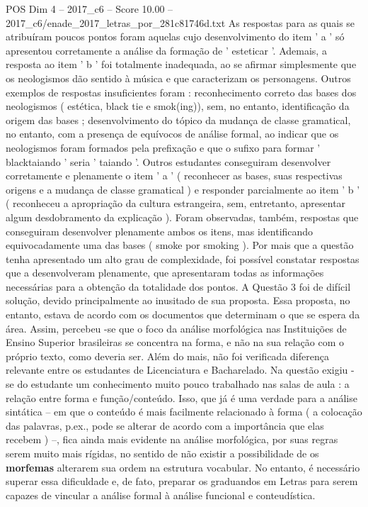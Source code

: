 \begin{textsample}{POS Dim 4 – 2017\_c6 – Score 10.00 – 2017\_c6/enade\_2017\_letras\_por\_281c81746d.txt}
As respostas para as quais se atribuíram poucos pontos foram aquelas cujo desenvolvimento do item ' a ' só apresentou corretamente a análise da formação de ' esteticar '.
Ademais, a resposta ao item ' b ' foi totalmente inadequada, ao se afirmar simplesmente que os neologismos dão sentido à música e que caracterizam os personagens.
Outros exemplos de respostas insuficientes foram : reconhecimento correto das bases dos neologismos ( estética, black tie e smok(ing)), sem, no entanto, identificação da origem das bases ; desenvolvimento do tópico da mudança de classe gramatical, no entanto, com a presença de equívocos de análise formal, ao indicar que os neologismos foram formados pela prefixação e que o sufixo para formar ' blacktaiando ' seria ' taiando '.
Outros estudantes conseguiram desenvolver corretamente e plenamente o item ' a ' ( reconhecer as bases, suas respectivas origens e a mudança de classe gramatical ) e responder parcialmente ao item ' b ' ( reconheceu a apropriação da cultura estrangeira, sem, entretanto, apresentar algum desdobramento da explicação ).
Foram observadas, também, respostas que conseguiram desenvolver plenamente ambos os itens, mas identificando equivocadamente uma das bases ( smoke por smoking ).
Por mais que a questão tenha apresentado um alto grau de complexidade, foi possível constatar respostas que a desenvolveram plenamente, que apresentaram todas as informações necessárias para a obtenção da totalidade dos pontos.
A Questão 3 foi de difícil solução, devido principalmente ao inusitado de sua proposta.
Essa proposta, no entanto, estava de acordo com os documentos que determinam o que se espera da área.
Assim, percebeu -se que o foco da análise morfológica nas Instituições de Ensino Superior brasileiras se concentra na forma, e não na sua relação com o próprio texto, como deveria ser.
Além do mais, não foi verificada diferença relevante entre os estudantes de Licenciatura e Bacharelado.
Na questão exigiu -se do estudante um conhecimento muito pouco trabalhado nas salas de aula : a relação entre forma e função/conteúdo.
Isso, que já é uma verdade para a análise sintática – em que o conteúdo é mais facilmente relacionado à forma ( a colocação das palavras, p.ex., pode se alterar de acordo com a importância que elas recebem ) –, fica ainda mais evidente na análise morfológica, por suas regras serem muito mais rígidas, no sentido de não existir a possibilidade de os \textbf{morfemas} alterarem sua ordem na estrutura vocabular.
No entanto, é necessário superar essa dificuldade e, de fato, preparar os graduandos em Letras para serem capazes de vincular a análise formal à análise funcional e conteudística.

\end{textsample}
